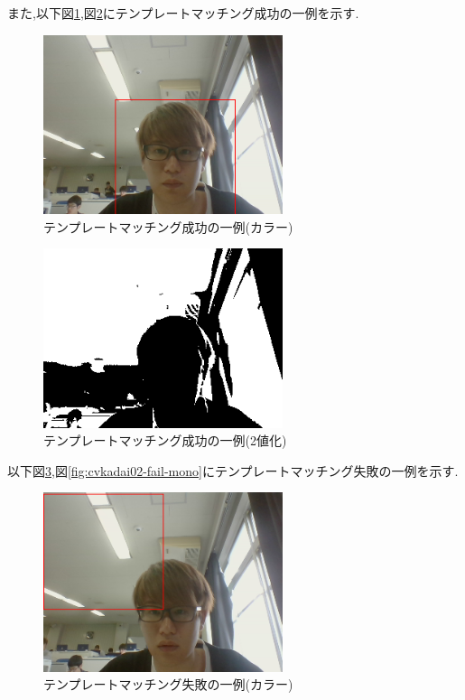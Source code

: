 \documentclass{jarticle}
\begin{document}
また,以下図\ref{fig:cvkadai02-success-color},図\ref{fig:cvkadai02-success-mono}にテンプレートマッチング成功の一例を示す.


\begin{figure}[H]
\begin{center}
\includegraphics[width=7.0cm]{cv_kadai02/success-color.png}
\caption{テンプレートマッチング成功の一例(カラー)}
\label{fig:cvkadai02-success-color}
\end{center}
\end{figure}

\begin{figure}[H]
\begin{center}
\includegraphics[width=7.0cm]{cv_kadai02/success-mono.png}
\caption{テンプレートマッチング成功の一例(2値化)}
\label{fig:cvkadai02-success-mono}
\end{center}
\end{figure}


以下図\ref{fig:cvkadai02-fail-color},図\ref{fig:cvkadai02-fail-mono}にテンプレートマッチング失敗の一例を示す.


\begin{figure}[H]
\begin{center}
\includegraphics[width=7.0cm]{cv_kadai02/fail-color.png}
\caption{テンプレートマッチング失敗の一例(カラー)}
\label{fig:cvkadai02-fail-color}
\end{center}
\end{figure}
\end{document}
